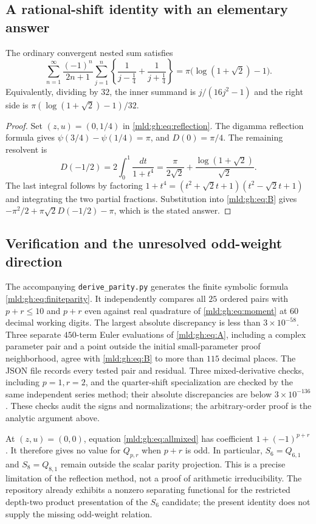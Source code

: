 \subsection{A rational-shift identity with an elementary answer}

\begin{corollary}\label{mld:gh:cor:quartershift}
The ordinary convergent nested sum satisfies
\begin{equation}\label{mld:gh:eq:quartershift}
 \boxed{
 \sum_{n=1}^{\infty}\frac{(-1)^n}{2n+1}
  \sum_{j=1}^n\left\{\frac1{j-\frac14}+\frac1{j+\frac14}\right\}
 =\pi\bigl(\log(1+\sqrt2)-1\bigr).}
\end{equation}
Equivalently, dividing by $32$, the inner summand is
$j/(16j^2-1)$ and the right side is
$\pi(\log(1+\sqrt2)-1)/32$.
\end{corollary}
\begin{proof}
Set $(z,u)=(0,1/4)$ in \eqref{mld:gh:eq:reflection}.
The digamma reflection formula gives
$\psi(3/4)-\psi(1/4)=\pi$, and $D(0)=\pi/4$.
The remaining resolvent is
\[
 D(-1/2)=2\int_0^1\frac{dt}{1+t^4}
 =\frac{\pi}{2\sqrt2}
       +\frac{\log(1+\sqrt2)}{\sqrt2}.
\]
The last integral follows by factoring
$1+t^4=(t^2+\sqrt2t+1)(t^2-\sqrt2t+1)$ and integrating the two
partial fractions. Substitution into \eqref{mld:gh:eq:B} gives
$-\pi^2/2+\pi\sqrt2D(-1/2)-\pi$, which is the stated answer.
\end{proof}

\subsection{Verification and the unresolved odd-weight direction}

The accompanying \texttt{derive\_parity.py} generates the finite symbolic
formula \eqref{mld:gh:eq:finiteparity}. It independently compares all $25$
ordered pairs with $p+r\leq10$ and $p+r$ even against real quadrature
of \eqref{mld:gh:eq:moment} at $60$ decimal working digits. The largest
absolute discrepancy is less than $3\times10^{-58}$.
Three separate $450$-term Euler evaluations of \eqref{mld:gh:eq:A}, including
a complex parameter pair and a point outside the initial small-parameter
proof neighborhood, agree with \eqref{mld:gh:eq:B} to more than $115$
decimal places. The JSON file records every tested pair and residual.
Three mixed-derivative checks, including $p=1,r=2$, and the quarter-shift
specialization are checked by the same independent series method; their
absolute discrepancies are below $3\times10^{-136}$.
These checks audit the signs and normalizations; the arbitrary-order
proof is the analytic argument above.

At $(z,u)=(0,0)$, equation \eqref{mld:gh:eq:allmixed} has coefficient
$1+(-1)^{p+r}$. It therefore gives no value for $Q_{p,r}$ when
$p+r$ is odd. In particular, $S_6=Q_{6,1}$ and $S_8=Q_{8,1}$ remain
outside the scalar parity projection. This is a precise limitation
of the reflection method, not a proof of arithmetic irreducibility.
The repository already exhibits a nonzero separating functional for
the restricted depth-two product presentation of the $S_6$ candidate;
the present identity does not supply the missing odd-weight relation.
